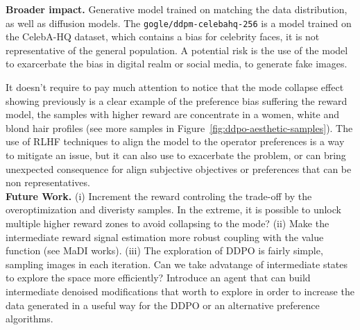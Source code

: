 \noindent\textbf{Broader impact.}  Generative model trained on matching
the data distribution, as well as diffusion models. The \texttt{gogle/ddpm-celebahq-256} is a model trained on the CelebA-HQ dataset, which contains a bias for celebrity faces, it is not representative of the general population.
A potential risk is the use of the model to exarcerbate the bias in digital realm or social media, to generate fake images.

It doesn't require to pay much attention to notice that the mode collapse effect showing previously is a clear example of the preference bias suffering the reward model, the samples with higher reward are concentrate in a women, white and blond hair profiles (see more samples in Figure~\ref{fig:ddpo-aesthetic-samples}). The
use of RLHF techniques to align the model to the operator preferences is a
way to mitigate an issue, but it can also use to exacerbate the problem, or can bring unexpected consequence for align subjective objectives or preferences
that can be non representatives.\\

\noindent\textbf{Future Work.} (i) Increment the reward controling the trade-off by the overoptimization and diveristy samples. In the extreme, it is possible to unlock multiple higher reward zones to avoid collapsing to the mode? (ii) Make the intermediate reward signal estimation more robust coupling with the value function (see MaDI works). (iii) The exploration of DDPO is
fairly simple, sampling images in each iteration. Can we take advatange of intermediate states to explore the space more efficiently? Introduce an agent that can build intermediate denoised modifications that worth to explore in order to increase the data generated in a useful way for the DDPO or an alternative preference algorithms.
